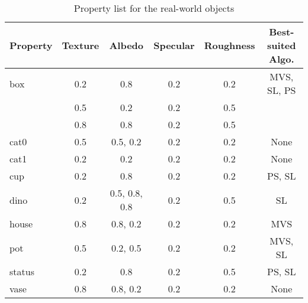 \begin{table}[!htbp]
  \centering
  \begin{tabular}{l*{5}{c}}
  \hline
  \textbf{Property} & Texture & Albedo & Specular & Roughness & Best-suited Algo.\\
  \hline
  box & 0.2 & 0.8 & 0.2 & 0.2 & MVS, SL, PS\\
      & 0.5 & 0.2 & 0.2 & 0.5 & \\
      & 0.8 & 0.8 & 0.2 & 0.5 & \\
  cat0 & 0.5 & 0.5, 0.2 & 0.2 & 0.2 & None\\
  cat1 & 0.2 & 0.2 & 0.2 & 0.2 & None\\
  cup & 0.2 & 0.8 & 0.2 & 0.2 & PS, SL\\
  dino & 0.2 & 0.5, 0.8, 0.8 & 0.2 & 0.5 & SL\\
  house & 0.8 & 0.8, 0.2 & 0.2 & 0.2 & MVS\\
  pot & 0.5 & 0.2, 0.5 & 0.2 & 0.2 & MVS, SL\\
  status & 0.2 & 0.8 & 0.2 & 0.5 & PS, SL\\
  vase & 0.8 & 0.8, 0.2 & 0.2 & 0.2 & None\\
  \hline
  \end{tabular}
  \caption{Property list for the real-world objects}
  \label{tab:real_data_prop_list}
\end{table}

